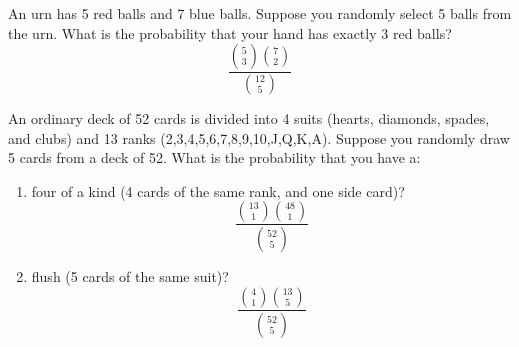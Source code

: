 \documentclass[letterpaper,12pt,fleqn]{article}
\begin{document}
\begin{example}
  An urn has 5 red balls and 7 blue balls.  Suppose you randomly select 5 balls from the urn.  What is the probability that
  your hand has exactly 3 red balls?
  \[\frac{\binom{5}{3}\binom{7}{2}}{\binom{12}{5}}\]
\end{example}

\begin{example}
  An ordinary deck of 52 cards is divided into 4 suits (hearts, diamonds, spades, and clubs) and 13 ranks
  (2,3,4,5,6,7,8,9,10,J,Q,K,A).  Suppose you randomly draw 5 cards from a deck of 52.  What is the probability that you have a:
  \begin{enumerate}[label={\alph*)}]
  \item four of a kind (4 cards of the same rank, and one side card)?
    \[\frac{\binom{13}{1}\binom{48}{1}}{\binom{52}{5}}\]

  \item flush (5 cards of the same suit)?
    \[\frac{\binom{4}{1}\binom{13}{5}}{\binom{52}{5}}\]
  \end{enumerate}
\end{example}
\end{document}
